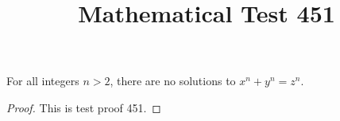 \documentclass{amsart}
\begin{document}
\title{Mathematical Test 451}
\begin{theorem}
For all integers $n > 2$, there are no solutions to $x^n + y^n = z^n$.
\end{theorem}
\begin{proof}
This is test proof 451.
\end{proof}
\end{document}
